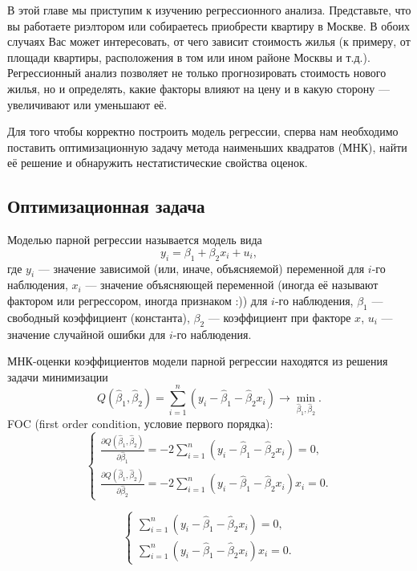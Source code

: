\documentclass[12pt]{article}
\newcommand{\hb}{\hat{\beta}}
\begin{document}
В этой главе мы приступим к изучению регрессионного анализа. Представьте, что вы работаете риэлтором или собираетесь приобрести квартиру в Москве. 
В обоих случаях Вас может интересовать, от чего зависит стоимость жилья (к примеру, 
от площади квартиры, расположения в том или ином районе Москвы и т.д.). Регрессионный анализ позволяет не только прогнозировать стоимость нового жилья, но и определять, какие факторы влияют на цену и в какую сторону — увеличивают или уменьшают её.

Для того чтобы корректно построить модель регрессии, сперва нам необходимо поставить оптимизационную задачу метода наименьших квадратов (МНК), найти её решение и обнаружить нестатистические свойства оценок. 


\subsection{Оптимизационная задача}
Моделью парной регрессии называется модель вида
\[
y_i = \beta_1 + \beta_2 x_i + u_i,
\]
где $y_i$ — значение зависимой (или, иначе, объясняемой) переменной для $i$-го наблюдения, $x_{i}$ — значение объясняющей переменной (иногда её называют фактором или регрессором, иногда признаком :)) для $i$-го наблюдения, $\beta_1$ — свободный коэффициент (константа), $\beta_2$ — коэффициент при факторе $x$, $u_i$ — значение случайной ошибки для $i$-го наблюдения.

МНК-оценки коэффициентов модели парной регрессии находятся из решения задачи минимизации
\[
Q(\hb_1, \hb_2) = \sum_{i=1}^n (y_i - \hb_1 - \hb_2 x_i) \to \underset{\hb_1, \hb_2}{\min} .
\]
FOC (first order condition, условие первого порядка):
\begin{equation*}
 \begin{cases}
\frac{\partial Q(\hb_1,\hb_2)}{\partial \hb_1} = -2\sum_{i=1}^n (y_i - \hb_1 - \hb_2 x_i) = 0,
\\
\frac{\partial Q(\hb_1,\hb_2)}{\partial \hb_2} = -2\sum_{i=1}^n (y_i - \hb_1 - \hb_2 x_i)x_i = 0.
 \end{cases}
\end{equation*}

\begin{equation*}
 \begin{cases}
\sum_{i=1}^n (y_i - \hb_1 - \hb_2 x_i) = 0,
\\
\sum_{i=1}^n (y_i - \hb_1 - \hb_2 x_i)x_i = 0.
 \end{cases}
\end{equation*}
\end{document}
